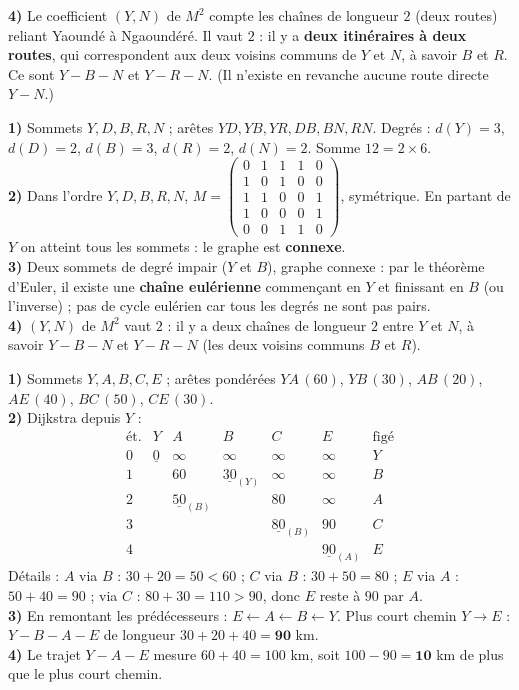 \smallskip
\textbf{4)} Le coefficient $(Y,N)$ de $M^2$ compte les chaînes de longueur $2$ (deux routes)
reliant Yaoundé à Ngaoundéré. Il vaut $2$ : il y a \textbf{deux itinéraires à deux routes},
qui correspondent aux deux voisins communs de $Y$ et $N$, à savoir $B$ et $R$. Ce sont
$Y\!-\!B\!-\!N$ et $Y\!-\!R\!-\!N$. (Il n'existe en revanche aucune route directe
$Y\!-\!N$.)

\textbf{1)} Sommets $Y,D,B,R,N$ ; arêtes $YD,YB,YR,DB,BN,RN$. Degrés : $d(Y)=3$, $d(D)=2$,
$d(B)=3$, $d(R)=2$, $d(N)=2$. Somme $12=2\times6$.\\
\textbf{2)} Dans l'ordre $Y,D,B,R,N$, $M=\begin{pmatrix}0&1&1&1&0\\1&0&1&0&0\\1&1&0&0&1\\
1&0&0&0&1\\0&0&1&1&0\end{pmatrix}$, symétrique. En partant de $Y$ on atteint tous les sommets :
le graphe est \textbf{connexe}.\\
\textbf{3)} Deux sommets de degré impair ($Y$ et $B$), graphe connexe : par le théorème
d'Euler, il existe une \textbf{chaîne eulérienne} commençant en $Y$ et finissant en $B$
(ou l'inverse) ; pas de cycle eulérien car tous les degrés ne sont pas pairs.\\
\textbf{4)} $(Y,N)$ de $M^2$ vaut $2$ : il y a deux chaînes de longueur $2$ entre $Y$ et $N$,
à savoir $Y\!-\!B\!-\!N$ et $Y\!-\!R\!-\!N$ (les deux voisins communs $B$ et $R$).

\textbf{1)} Sommets $Y,A,B,C,E$ ; arêtes pondérées $YA\,(60)$, $YB\,(30)$, $AB\,(20)$,
$AE\,(40)$, $BC\,(50)$, $CE\,(30)$.\\
\textbf{2)} Dijkstra depuis $Y$ :
\[
\begin{array}{c|ccccc|l}
\text{ét.} & Y & A & B & C & E & \text{figé}\\\hline
0 & \underline{0} & \infty & \infty & \infty & \infty & Y\\
1 & & 60 & \underline{30}_{(Y)} & \infty & \infty & B\\
2 & & \underline{50}_{(B)} & & 80 & \infty & A\\
3 & & & & \underline{80}_{(B)} & 90 & C\\
4 & & & & & \underline{90}_{(A)} & E
\end{array}
\]
Détails : $A$ via $B$ : $30+20=50<60$ ; $C$ via $B$ : $30+50=80$ ; $E$ via $A$ : $50+40=90$ ;
via $C$ : $80+30=110>90$, donc $E$ reste à $90$ par $A$.\\
\textbf{3)} En remontant les prédécesseurs : $E\leftarrow A\leftarrow B\leftarrow Y$. Plus
court chemin $Y\to E$ : $Y-B-A-E$ de longueur $30+20+40=\mathbf{90}$ km.\\
\textbf{4)} Le trajet $Y-A-E$ mesure $60+40=100$ km, soit $100-90=\mathbf{10}$ km de plus que
le plus court chemin.

